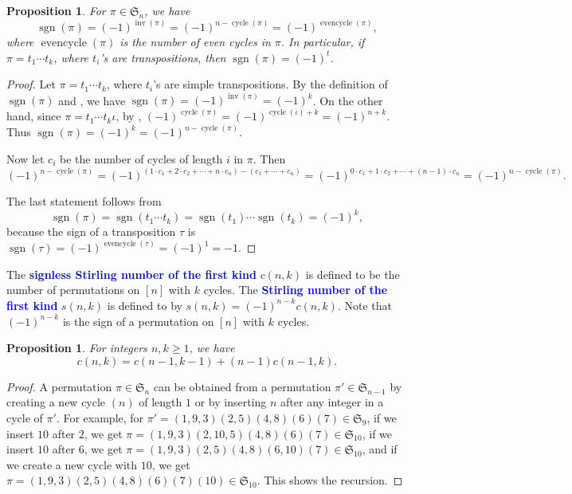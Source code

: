 \documentclass[oneside]{book}
\numberwithin{equation}{section}
\newtheorem{prop}[thm]{Proposition}
\theoremstyle{definition}
\newcommand\evencycle{\operatorname{evencycle}}
\newcommand\inv{\operatorname{inv}}
\newcommand\cycle{\operatorname{cycle}}
\newcommand\sgn{\operatorname{sgn}}
\newcommand\sym{\mathfrak{S}}
\renewcommand\emph[1]{\textcolor{blue}{\bf #1}}
\begin{document}
\begin{prop}
  For \( \pi\in \sym_n \), we have
  \[
    \sgn(\pi) = (-1)^{\inv(\pi)} = (-1)^{n-\cycle(\pi)} =
    (-1)^{\evencycle(\pi)},
  \]
  where \( \evencycle(\pi) \) is the number of even cycles in
  \( \pi \). In particular, if \( \pi = t_1 \cdots t_k \), where
  \( t_i \)'s are transpositions, then \( \sgn(\pi) = (-1)^{t} \).
\end{prop}
\begin{proof}
  Let \( \pi = t_1 \cdots t_k \), where \( t_i \)'s are simple
  transpositions. By the definition of \( \sgn(\pi) \) and
  , we have
  \( \sgn(\pi) = (-1)^{\inv(\pi)} = (-1)^{k} \). On the other hand,
  since \( \pi = t_1 \cdots t_k\iota \), by ,
  \( (-1)^{\cycle(\pi)} = (-1)^{\cycle(\iota)+k} = (-1)^{n+k} \).
  Thus \( \sgn(\pi) = (-1)^{k} = (-1)^{n-\cycle(\pi)} \).

  Now let \( c_i \) be the number of cycles of length \( i \) in
  \( \pi \). Then
  \[
    (-1)^{n-\cycle(\pi)} = (-1)^{(1\cdot c_1 + 2\cdot c_2 + \cdots + n
      \cdot c_n) - (c_1 + \cdots + c_n)} =(-1)^{0\cdot c_1 + 1\cdot
      c_2 + \cdots + (n-1) \cdot c_n} = (-1)^{n-\cycle(\pi)}.
  \]

  The last statement follows from
  \[
    \sgn(\pi) = \sgn(t_1 \cdots t_k) = \sgn(t_1) \cdots \sgn(t_k)
    = (-1)^{k},
  \]
  because the sign of a transposition \( \tau \) is
  \( \sgn(\tau) = (-1)^{\evencycle(\tau)} = (-1)^1 = -1 \).
\end{proof}

The \emph{signless Stirling number of the first kind} \( c(n,k) \) is
defined to be the number of permutations on \( [n] \) with \( k \)
cycles. The \emph{Stirling number of the first kind} \( s(n,k) \) is
defined to by \( s(n,k) = (-1)^{n-k} c(n,k) \). Note that
\( (-1)^{n-k} \) is the sign of a permutation on \( [n] \) with
\( k \) cycles.

\begin{prop}
  For integers \( n,k\ge1 \), we have
  \begin{equation}\label{eq:c(n,k)-rec}
    c(n,k) = c(n-1,k-1) + (n-1) c(n-1,k).
  \end{equation}
\end{prop}
\begin{proof}
  A permutation \( \pi \in \sym_n \) can be obtained from a
  permutation \( \pi'\in \sym_{n-1} \) by creating a new cycle
  \( (n) \) of length \( 1 \) or by inserting \( n \) after any
  integer in a cycle of \( \pi' \). For example, for
  \( \pi' = (1,9,3)(2,5)(4,8) (6) (7) \in \sym_9 \), if we insert
  \( 10 \) after \( 2 \), we get
  \( \pi = (1,9,3)(2,10,5)(4,8) (6) (7) \in \sym_{10} \), if we insert
  \( 10 \) after \( 6 \), we get
  \( \pi = (1,9,3)(2,5)(4,8) (6,10) (7) \in \sym_{10} \), and if we
  create a new cycle with \( 10 \), we get
  \( \pi = (1,9,3)(2,5)(4,8) (6) (7) (10) \in \sym_{10} \). This shows
  the recursion.
\end{proof}
\end{document}
